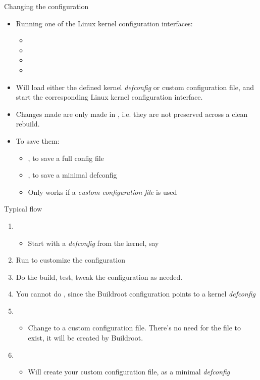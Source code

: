 \begin{frame}{Changing the configuration}
  \begin{itemize}
  \item Running one of the Linux kernel configuration interfaces:
    \begin{itemize}
    \item {}
    \item {}
    \item {}
    \item {}
    \end{itemize}
  \item Will load either the defined kernel {\em defconfig} or custom
    configuration file, and start the corresponding Linux kernel
    configuration interface.
  \item Changes made are only made in
    , i.e. they are not preserved
    across a clean rebuild.
  \item To save them:
    \begin{itemize}
    \item {}, to save a full config file
    \item {}, to save a minimal defconfig
    \item Only works if a {\em custom configuration file} is used
    \end{itemize}
  \end{itemize}
\end{frame}

\begin{frame}{Typical flow}
  \begin{enumerate}
  \item {}
    \begin{itemize}
    \item Start with a {\em defconfig} from the kernel, say 
    \end{itemize}
  \item Run  to customize the
    configuration
  \item Do the build, test, tweak the configuration as needed.
  \item You cannot do ,
    since the Buildroot configuration points to a kernel {\em
      defconfig}
  \item {}
    \begin{itemize}
    \item Change to a custom configuration file. There's no need for
      the file to exist, it will be created by Buildroot.
    \end{itemize}
  \item {}
    \begin{itemize}
    \item Will create your custom configuration file, as a minimal
      {\em defconfig}
    \end{itemize}
  \end{enumerate}
\end{frame}
